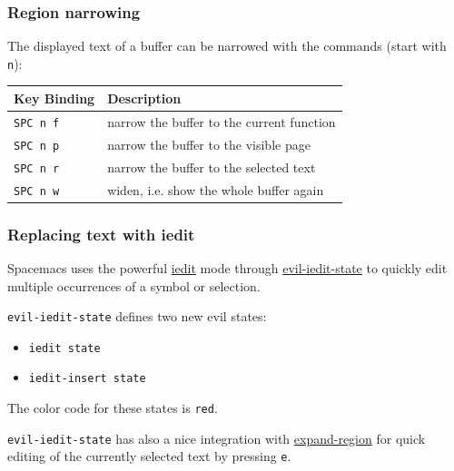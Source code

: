 \documentclass[11pt]{article}
\begin{document}
\subsubsection{Region narrowing}
\label{sec:orgb830a87}
The displayed text of a buffer can be narrowed with the commands (start with
\texttt{n}):

\begin{center}
\begin{tabular}{ll}
Key Binding & Description\\
\hline
\texttt{SPC n f} & narrow the buffer to the current function\\
\texttt{SPC n p} & narrow the buffer to the visible page\\
\texttt{SPC n r} & narrow the buffer to the selected text\\
\texttt{SPC n w} & widen, i.e. show the whole buffer again\\
\end{tabular}
\end{center}

\subsubsection{Replacing text with iedit}
\label{sec:org32b6bb9}
Spacemacs uses the powerful \href{https://github.com/tsdh/iedit}{iedit} mode through \href{https://github.com/syl20bnr/evil-iedit-state}{evil-iedit-state} to quickly
edit multiple occurrences of a symbol or selection.

\texttt{evil-iedit-state} defines two new evil states:
\begin{itemize}
\item \texttt{iedit state}
\item \texttt{iedit-insert state}
\end{itemize}

The color code for these states is \texttt{red}.

\texttt{evil-iedit-state} has also a nice integration with \href{https://github.com/magnars/expand-region.el}{expand-region} for quick
editing of the currently selected text by pressing \texttt{e}.
\end{document}
